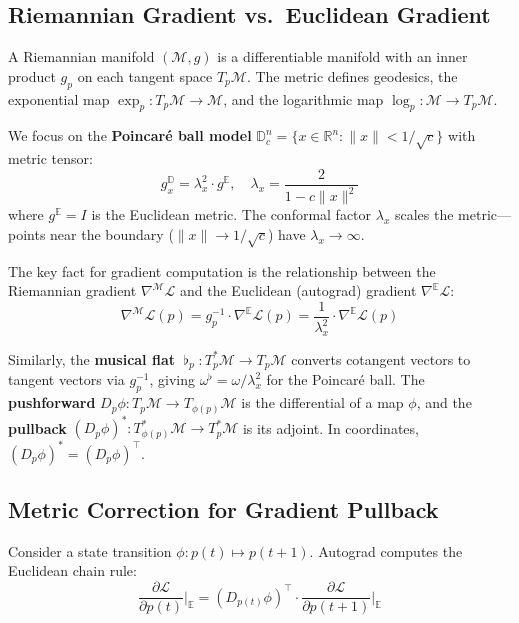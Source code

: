 \documentclass[a4paper,fleqn]{cas-dc}
\newcommand{\lambdax}{\lambda_x}
\newcommand{\mflat}{\mathbin{\flat}}
\begin{document}
\subsection{Riemannian Gradient vs.\ Euclidean Gradient}

A Riemannian manifold $(\mathcal{M}, g)$ is a differentiable manifold with an inner product $g_p$ on each tangent space $T_p\mathcal{M}$. The metric defines geodesics, the exponential map $\exp_p: T_p\mathcal{M} \to \mathcal{M}$, and the logarithmic map $\log_p: \mathcal{M} \to T_p\mathcal{M}$.

We focus on the \textbf{Poincar\'e ball model} $\mathbb{D}^n_c = \{x \in \mathbb{R}^n: \|x\| < 1/\sqrt{c}\}$ with metric tensor:
\begin{equation}
g_x^{\mathbb{D}} = \lambdax^2 \cdot g^{\mathbb{E}}, \quad \lambdax = \frac{2}{1 - c\|x\|^2}
\label{eq:poincare_metric}
\end{equation}
where $g^{\mathbb{E}} = I$ is the Euclidean metric. The conformal factor $\lambdax$ scales the metric---points near the boundary ($\|x\| \to 1/\sqrt{c}$) have $\lambdax \to \infty$.

The key fact for gradient computation is the relationship between the Riemannian gradient $\nabla^{\mathcal{M}}\mathcal{L}$ and the Euclidean (autograd) gradient $\nabla^{\mathbb{E}}\mathcal{L}$:
\begin{equation}
\nabla^{\mathcal{M}}\mathcal{L}(p) = g_p^{-1} \cdot \nabla^{\mathbb{E}}\mathcal{L}(p) = \frac{1}{\lambdax^2} \cdot \nabla^{\mathbb{E}}\mathcal{L}(p)
\label{eq:riemannian_gradient}
\end{equation}

Similarly, the \textbf{musical flat} $\mflat_p: T^*_p\mathcal{M} \to T_p\mathcal{M}$ converts cotangent vectors to tangent vectors via $g_p^{-1}$, giving $\omega^{{\mflat}} = \omega / \lambda_x^2$ for the Poincar\'e ball. The \textbf{pushforward} $D_p\phi: T_p\mathcal{M} \to T_{\phi(p)}\mathcal{M}$ is the differential of a map $\phi$, and the \textbf{pullback} $(D_p\phi)^*: T^*_{\phi(p)}\mathcal{M} \to T^*_p\mathcal{M}$ is its adjoint. In coordinates, $(D_p\phi)^* = (D_p\phi)^\top$.

\subsection{Metric Correction for Gradient Pullback}

Consider a state transition $\phi: p(t) \mapsto p(t+1)$. Autograd computes the Euclidean chain rule:
\begin{equation}
\frac{\partial\mathcal{L}}{\partial p(t)}\bigg|_{\mathbb{E}} = (D_{p(t)}\phi)^\top \cdot \frac{\partial\mathcal{L}}{\partial p(t+1)}\bigg|_{\mathbb{E}}
\label{eq:euclidean_chain}
\end{equation}
\end{document}
